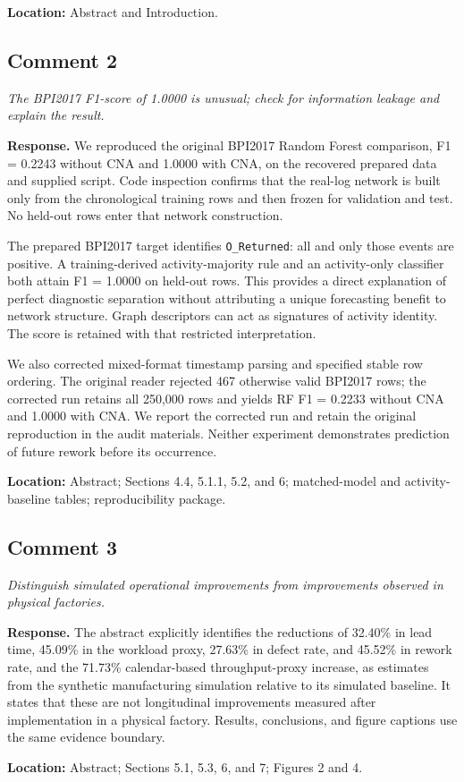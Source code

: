 \documentclass[11pt,a4paper]{article}
\newcommand{\commentitem}[2]{\Needspace{9\baselineskip}\subsection*{Comment #1}\textit{#2}\par\textbf{Response.} }
\begin{document}
\textbf{Location:} Abstract and Introduction.

\commentitem{2}{The BPI2017 F1-score of 1.0000 is unusual; check for information leakage and explain the result.}
We reproduced the original BPI2017 Random Forest comparison, F1 = 0.2243 without CNA and 1.0000 with CNA, on the recovered prepared data and supplied script. Code inspection confirms that the real-log network is built only from the chronological training rows and then frozen for validation and test. No held-out rows enter that network construction.

The prepared BPI2017 target identifies \texttt{O\_Returned}: all and only those events are positive. A training-derived activity-majority rule and an activity-only classifier both attain F1 = 1.0000 on held-out rows. This provides a direct explanation of perfect diagnostic separation without attributing a unique forecasting benefit to network structure. Graph descriptors can act as signatures of activity identity. The score is retained with that restricted interpretation.

We also corrected mixed-format timestamp parsing and specified stable row ordering. The original reader rejected 467 otherwise valid BPI2017 rows; the corrected run retains all 250,000 rows and yields RF F1 = 0.2233 without CNA and 1.0000 with CNA. We report the corrected run and retain the original reproduction in the audit materials. Neither experiment demonstrates prediction of future rework before its occurrence.

\textbf{Location:} Abstract; Sections 4.4, 5.1.1, 5.2, and 6; matched-model and activity-baseline tables; reproducibility package.

\commentitem{3}{Distinguish simulated operational improvements from improvements observed in physical factories.}
The abstract explicitly identifies the reductions of 32.40\% in lead time, 45.09\% in the workload proxy, 27.63\% in defect rate, and 45.52\% in rework rate, and the 71.73\% calendar-based throughput-proxy increase, as estimates from the synthetic manufacturing simulation relative to its simulated baseline. It states that these are not longitudinal improvements measured after implementation in a physical factory. Results, conclusions, and figure captions use the same evidence boundary.

\textbf{Location:} Abstract; Sections 5.1, 5.3, 6, and 7; Figures 2 and 4.
\end{document}
